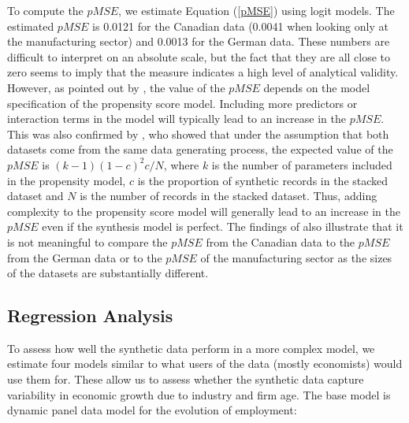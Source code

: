 To compute the $pMSE$, we estimate Equation (\ref{pMSE}) using logit models. The estimated $pMSE$ is 0.0121 for the Canadian data (0.0041 when looking only at the manufacturing sector) and 0.0013 for the German data. These numbers are difficult to interpret on an absolute scale, but the fact that they are all close to zero seems to imply that the measure indicates a high level of analytical validity. However, as pointed out by \citet{Woo_Reiter_Oganian_Karr_2009}, the value of the $pMSE$ depends on the model specification of the propensity score model. Including more predictors or interaction terms in the model will typically lead to an increase in the $pMSE$. This was also confirmed by \citet{Snoke_RSSA2018}, who showed that under the assumption that both datasets come from the same data generating process, the expected value of the $pMSE$ is $(k-1)(1-c)^2c/N$, where $k$ is the number of parameters included in the propensity model, $c$ is the proportion of synthetic records in the stacked dataset and $N$ is the number of records in the stacked dataset. Thus, adding complexity to the propensity score model will generally lead to an increase in the $pMSE$ even if the synthesis model is perfect. The findings of \citet{Snoke_RSSA2018} also illustrate that it is not meaningful to compare the $pMSE$ from the Canadian data to the $pMSE$ from the German data or to the $pMSE$ of the manufacturing sector as the sizes of the datasets are substantially different. 



\subsection{Regression Analysis}

To assess how well the synthetic data perform in a more complex model, we estimate four models similar to what users of the data (mostly economists) would use them for. These allow us to assess whether the synthetic data capture variability in economic growth due to industry and firm age.
The base model is  dynamic panel data model for the evolution of employment:

